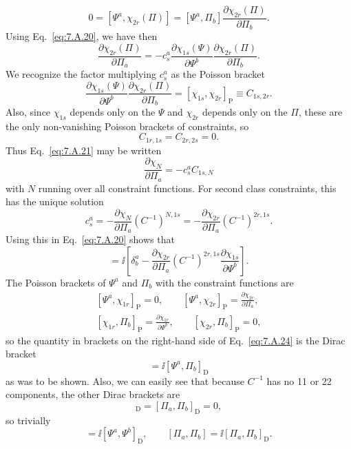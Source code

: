 \[
  0=[\Psi^a,\chi_{2r}(\Pi)]
  =[\Psi^a,\Pi_b]\frac{\partial\chi_{2r}(\Pi)}{\partial\Pi_b}.
\]
Using Eq.~\eqref{eq:7.A.20}, we have then
\begin{equation}
  \frac{\partial\chi_{2r}(\Pi)}{\partial\Pi_a}
  =-c^a_s\frac{\partial\chi_{1s}(\Psi)}{\partial\Psi^b}
    \frac{\partial\chi_{2r}(\Pi)}{\partial\Pi_b}.
  \tag{7.A.21}\label{eq:7.A.21}
\end{equation}
We recognize the factor multiplying $c^a_s$ as the Poisson bracket
\[
  \frac{\partial\chi_{1s}(\Psi)}{\partial\Psi^b}
  \frac{\partial\chi_{2r}(\Pi)}{\partial\Pi_b}
  =[\chi_{1s},\chi_{2r}]_{\mathrm P}\equiv C_{1s,2r}.
\]
Also, since $\chi_{1s}$ depends only on the $\Psi$ and $\chi_{2r}$ depends
only on the $\Pi$, these are the only non-vanishing Poisson brackets of
constraints, so
\[
  C_{1r,1s}=C_{2r,2s}=0.
\]
Thus Eq.~\eqref{eq:7.A.21} may be written
\begin{equation}
  \frac{\partial\chi_N}{\partial\Pi_a}=-c^a_s C_{1s,N}
  \tag{7.A.22}\label{eq:7.A.22}
\end{equation}
with $N$ running over all constraint functions. For second class constraints,
this has the unique solution
\begin{equation}
  c^a_s=-\frac{\partial\chi_N}{\partial\Pi_a}(C^{-1})^{N,1s}
  =-\frac{\partial\chi_{2r}}{\partial\Pi_a}(C^{-1})^{2r,1s}.
  \tag{7.A.23}\label{eq:7.A.23}
\end{equation}
Using this in Eq.~\eqref{eq:7.A.20} shows that
\begin{equation}
  [\Psi^a,\Pi_b]
  =\ii\left[\delta^a_b
  -\frac{\partial\chi_{2r}}{\partial\Pi_a}(C^{-1})^{2r,1s}
   \frac{\partial\chi_{1s}}{\partial\Psi^b}\right].
  \tag{7.A.24}\label{eq:7.A.24}
\end{equation}
The Poisson brackets of $\Psi^a$ and $\Pi_b$ with the constraint functions are
\begin{equation}
  \begin{gathered}
    [\Psi^a,\chi_{1r}]_{\mathrm P}=0,
    \qquad
    [\Psi^a,\chi_{2r}]_{\mathrm P}
    =\frac{\partial\chi_{2r}}{\partial\Pi_a},\\
    [\chi_{1r},\Pi_b]_{\mathrm P}
    =\frac{\partial\chi_{1r}}{\partial\Psi^b},
    \qquad
    [\chi_{2r},\Pi_b]_{\mathrm P}=0,
  \end{gathered}
  \tag{7.A.25}\label{eq:7.A.25}
\end{equation}
so the quantity in brackets on the right-hand side of Eq.~\eqref{eq:7.A.24} is the
Dirac bracket
\begin{equation}
  [\Psi^a,\Pi_b]=\ii[\Psi^a,\Pi_b]_{\mathrm D}
  \tag{7.A.26}\label{eq:7.A.26}
\end{equation}
as was to be shown. Also, we can easily see that because $C^{-1}$ has no 11
or 22 components, the other Dirac brackets are
\begin{equation}
  [\Psi^a,\Psi^b]_{\mathrm D}=[\Pi_a,\Pi_b]_{\mathrm D}=0,
  \tag{7.A.27}\label{eq:7.A.27}
\end{equation}
so trivially
\begin{equation}
  [\Psi^a,\Psi^b]=\ii[\Psi^a,\Psi^b]_{\mathrm D},
  \qquad
  [\Pi_a,\Pi_b]=\ii[\Pi_a,\Pi_b]_{\mathrm D}.
  \tag{7.A.28}\label{eq:7.A.28}
\end{equation}

